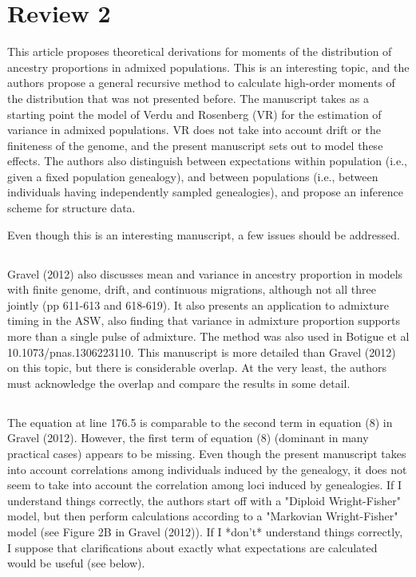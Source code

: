 \documentclass[11pt]{amsart}
\begin{document}
\section{Review 2}
This article proposes theoretical derivations for moments of the distribution of ancestry proportions in admixed populations. This is an interesting topic, and the authors propose a general recursive method to calculate high-order moments of the distribution that was not presented before. The manuscript takes as a starting point the model of Verdu and Rosenberg (VR) for the estimation of variance in admixed populations. VR does not take into account drift or the finiteness of the genome, and the present manuscript sets out to model these effects. The authors also distinguish between expectations within population (i.e., given a fixed population genealogy), and between populations (i.e., between individuals having independently sampled genealogies), and propose an inference scheme for structure data.

Even though this is an interesting manuscript, a few issues should be addressed.\\
\subsection{}
Gravel (2012) also discusses mean and variance in ancestry proportion in models with finite genome, drift,
and continuous migrations, although not all three jointly (pp 611-613 and 618-619). It also presents an
application to admixture timing in the ASW, also finding that variance in admixture proportion supports
more than a single pulse of admixture. The method was also used in Botigue et al 10.1073/pnas.1306223110.
This manuscript is more detailed than Gravel (2012) on this topic, but there is considerable overlap. At
the very least, the authors must acknowledge the overlap and compare the results in some detail.\\
\subsection{}
The equation at line 176.5 is comparable to the second term in equation (8) in Gravel (2012).
However, the first term of equation (8) (dominant in many practical cases) appears to be missing. Even
though the present manuscript takes into account correlations among individuals induced by the
genealogy, it does not seem to take into account the correlation among loci induced by genealogies.
If I understand things correctly, the authors start off with a "Diploid Wright-Fisher" model, but then
perform calculations according to a "Markovian Wright-Fisher" model (see Figure 2B in Gravel (2012)). If I
*don't* understand things correctly, I suppose that clarifications about exactly what expectations are
calculated would be useful (see below).
\end{document}
